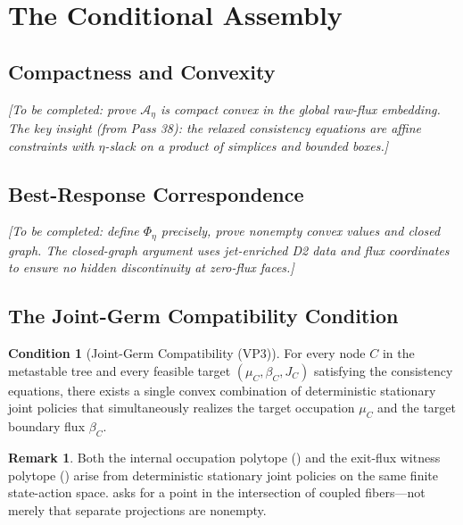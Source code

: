 \documentclass[12pt,a4paper]{article}
\theoremstyle{definition}
\newtheorem{remark}[theorem]{Remark}
\newtheorem{condition}[theorem]{Condition}
\begin{document}
\section{The Conditional Assembly}
\label{sec:assembly}

\subsection{Compactness and Convexity}

\textit{[To be completed: prove $\mathcal{A}_\eta$ is compact convex in the global raw-flux embedding.  The key insight (from Pass 38): the relaxed consistency equations are affine constraints with $\eta$-slack on a product of simplices and bounded boxes.]}

\subsection{Best-Response Correspondence}

\textit{[To be completed: define $\Phi_\eta$ precisely, prove nonempty convex values and closed graph.  The closed-graph argument uses jet-enriched D2 data and flux coordinates to ensure no hidden discontinuity at zero-flux faces.]}

\subsection{The Joint-Germ Compatibility Condition}

\begin{condition}[Joint-Germ Compatibility (VP3)]
\label{cond:vp3}
For every node $C$ in the metastable tree and every feasible target $(\mu_C, \beta_C, J_C)$ satisfying the consistency equations, there exists a single convex combination of deterministic stationary joint policies that simultaneously realizes the target occupation $\mu_C$ and the target boundary flux $\beta_C$.
\end{condition}

\begin{remark}
Both the internal occupation polytope () and the exit-flux witness polytope () arise from deterministic stationary joint policies on the same finite state-action space.   asks for a point in the intersection of coupled fibers---not merely that separate projections are nonempty.
\end{remark}
\end{document}
